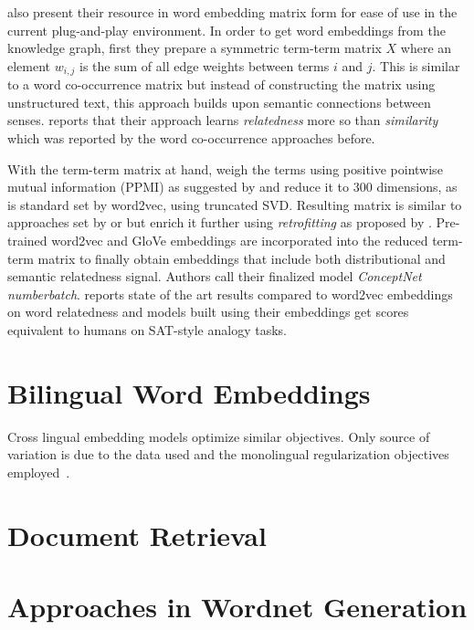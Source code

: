 \citeauthor{speer_conceptnet_2017} also present their resource in word embedding matrix form for ease of use in the current plug-and-play environment.
In order to get word embeddings from the knowledge graph, first they prepare a symmetric term-term matrix $X$ where an element $w_{i,j}$ is the sum of all edge weights between terms $i$ and $j$.
This is similar to a word co-occurrence matrix but instead of constructing the matrix using unstructured text, this approach builds upon semantic connections between senses.
\citeauthor{speer_conceptnet_2017} reports that their approach learns \emph{relatedness} more so than \emph{similarity} which was reported by the word co-occurrence approaches before.

With the term-term matrix at hand, \citeauthor{speer_conceptnet_2017} weigh the terms using positive pointwise mutual information (PPMI) as suggested by \textcite{levy_improving_2015} and reduce it to 300 dimensions, as is standard set by word2vec, using truncated SVD\@.
Resulting matrix is similar to approaches set by \textcite{deerwester_indexing_1990} or \textcite{pennington_glove_2014} but \citeauthor{speer_conceptnet_2017} enrich it further using \emph{retrofitting} as proposed by \textcite{faruqui_improving_2014}.
Pre-trained word2vec and GloVe embeddings are incorporated into the reduced term-term matrix to finally obtain embeddings that include both distributional and semantic relatedness signal.
Authors call their finalized model \emph{ConceptNet numberbatch}.
\citeauthor{speer_conceptnet_2017} reports state of the art results compared to word2vec embeddings on word relatedness and models built using their embeddings get scores equivalent to humans on SAT-style analogy tasks.

\section{Bilingual Word Embeddings}%
\label{sec:bilingual_word_embeddings}

Cross lingual embedding models optimize similar objectives.
Only source of variation is due to the data used and the monolingual regularization objectives employed~\cite{ruder_survey_2017}.

\section{Document Retrieval}%
\label{sec:document_retrieval}

\section{Approaches in Wordnet Generation}%
\label{sec:approaches_in_wordnet_generation}


